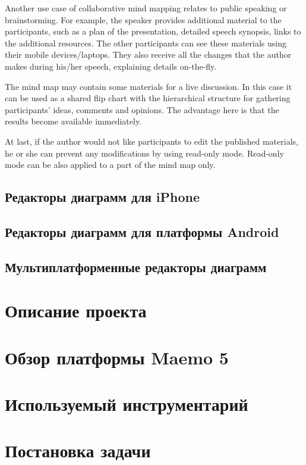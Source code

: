 
Another use case of collaborative mind mapping relates to public speaking or
brainstorming. For example, the speaker provides additional material to the
participants, such as a plan of the presentation, detailed speech synopsis,
links to the additional resources. The other participants can see these
materials using their mobile devices/laptops. They also receive all the changes
that the author makes during his/her speech, explaining details on-the-fly.

The mind map may contain some materials for a live discussion. In this case it
can be used as a shared flip chart with the hierarchical structure for gathering
participants' ideas, comments and opinions. The advantage here is that the
results become available immediately.

At last, if the author would not like participants to edit the published
materials, he or she can prevent any modifications by using read-only mode.
Read-only mode can be also applied to a part of the mind map only.

\subsection{Редакторы диаграмм для iPhone}

\subsection{Редакторы диаграмм для платформы Android}

\subsection{Мультиплатформенные редакторы диаграмм}

\section{Описание проекта}\label{sec:project_summary}

\section{Обзор платформы Maemo 5}\label{sec:compare_platforms}

\section{Используемый инструментарий}\label{sec:choose_toolkit}

\section{Постановка задачи}\label{sec:statement_task}
